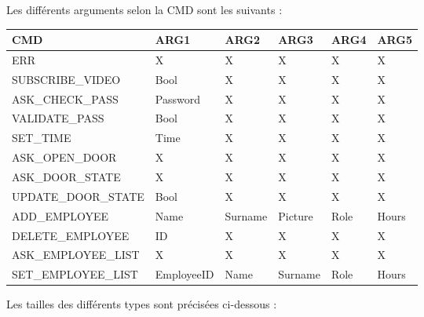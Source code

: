             \begin {table}[H]
            Les différents arguments selon la CMD sont les suivants : 
            \center
            \begin{tabularx}{\textwidth}{|X|p{1.9cm}|p{1.3cm}|p{1.3cm}|p{1.1cm}|p{1.1cm}|}
                \hline
                \textbf{CMD} & \textbf{ARG1} & \textbf{ARG2} & \textbf{ARG3} & \textbf{ARG4} & \textbf{ARG5}\\
                \hline
                ERR & X & X & X & X & X \\
                \hline
                SUBSCRIBE\_VIDEO & Bool & X & X & X & X \\
                \hline 
                ASK\_CHECK\_PASS & Password & X & X & X & X \\
                \hline
                VALIDATE\_PASS & Bool & X & X & X & X \\
                \hline
                SET\_TIME & Time & X & X & X & X \\
                \hline
                ASK\_OPEN\_DOOR & X & X & X & X & X \\
                \hline
                ASK\_DOOR\_STATE & X & X & X & X & X \\
                \hline
                UPDATE\_DOOR\_STATE & Bool & X & X & X & X \\
                \hline
                ADD\_EMPLOYEE & Name & Surname & Picture & Role & Hours \\
                \hline
                DELETE\_EMPLOYEE & ID & X & X & X & X \\
                \hline
                ASK\_EMPLOYEE\_LIST & X & X & X & X & X \\
                \hline
                SET\_EMPLOYEE\_LIST & EmployeeID & Name & Surname & Role & Hours \\
                \hline
            \end{tabularx}
            \end{table}

\newpage

    Les tailles des différents types sont précisées ci-dessous : 

